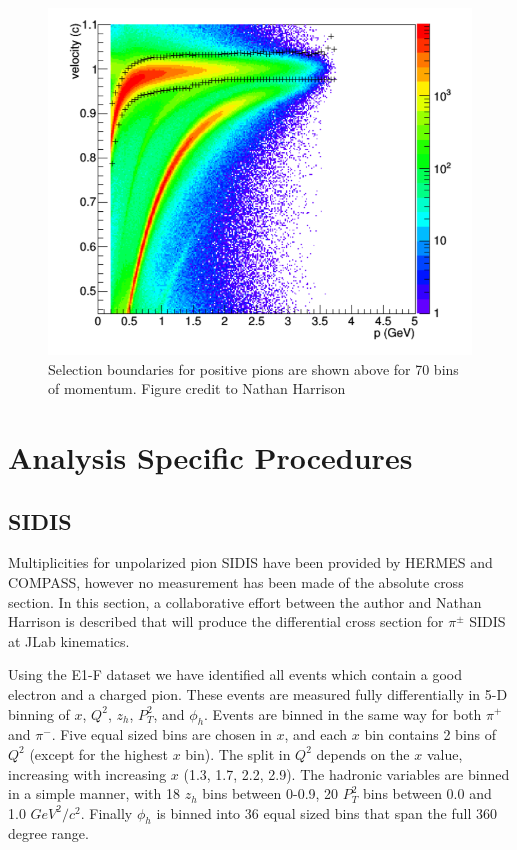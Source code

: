 \begin{figure}
  \centering 
  \includegraphics[width=12cm]{image/nathan-pip.png}
  \caption{Selection boundaries for positive pions are shown above for 70 bins of momentum.  Figure credit to Nathan Harrison \cite{theses-harrison:2015}}
\end{figure}

\section{Analysis Specific Procedures}

\subsection{SIDIS}
Multiplicities for unpolarized pion SIDIS have been provided by HERMES and COMPASS, however no measurement has been made of the absolute cross section.  In this section, a collaborative effort between the author and Nathan Harrison is described that will produce the differential cross section for $\pi^{\pm}$ SIDIS at JLab kinematics.  

Using the E1-F dataset we have identified all events which contain a good electron and a charged pion.  These events are measured fully differentially in 5-D binning of $x$, $Q^2$, $z_h$, $P_{T}^{2}$, and $\phi_h$.  Events are binned in the same way for both $\pi^+$ and $\pi^-$.  Five equal sized bins are chosen in $x$, and each $x$ bin contains 2 bins of $Q^2$ (except for the highest $x$ bin).  The split in $Q^2$ depends on the $x$ value, increasing with increasing $x$ (1.3, 1.7, 2.2, 2.9).  The hadronic variables are binned in a simple manner, with 18 $z_h$ bins between 0-0.9, 20 $P_{T}^{2}$ bins between 0.0 and 1.0 $GeV^2/c^2$.  Finally $\phi_h$ is binned into 36 equal sized bins that span the full 360 degree range. \\


